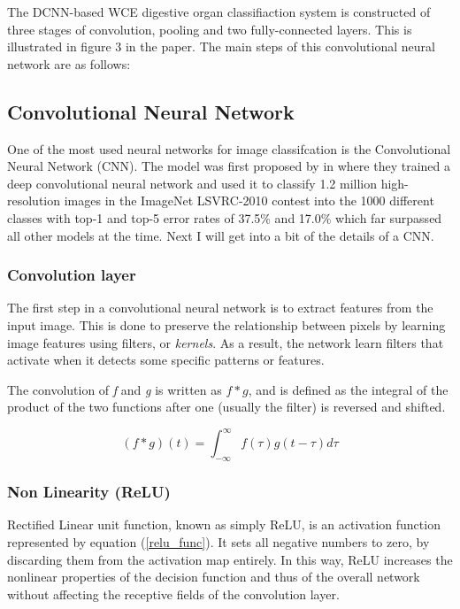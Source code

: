 \documentclass[english, a4paper]{report}
\begin{document}
The DCNN-based WCE digestive organ classifiaction system is constructed of three stages of convolution, pooling and two fully-connected layers. This is illustrated in figure 3 in the paper. \cite{ClassifyingDigestive15} The main steps of this convolutional neural network are as follows:

\subsection{Convolutional Neural Network}
One of the most used neural networks for image classifcation is the Convolutional Neural Network (CNN). The model was first proposed by \citeauthor*{ImageNetClassification12} in \citeyear{ImageNetClassification12} \cite{ImageNetClassification12} where they trained a deep convolutional neural network and used it to classify 1.2 million high-resolution images in the ImageNet LSVRC-2010 contest into the 1000 different classes with top-1 and top-5 error rates of 37.5\% and 17.0\% which far surpassed all other models at the time. Next I will get into a bit of the details of a CNN.


\subsubsection{Convolution layer}
The first step in a convolutional neural network is to extract features from the input image. This is done to preserve the relationship between pixels by learning image features using filters, or \textit{kernels}. As a result, the network learn filters that activate when it detects some specific patterns or features.

The convolution of \textit{f} and \textit{g} is written as $f*g$, and is defined as the integral of the product of the two functions after one (usually the filter) is reversed and shifted.

\begin{equation} %
  (f*g)(t) = \int_{-\infty}^{\infty} f(\tau) g(t-\tau) d\tau
  \label{convolution_func}
\end{equation}


\subsubsection{Non Linearity (ReLU)}
Rectified Linear unit function, known as simply ReLU, is an activation function represented by equation (\ref{relu_func}). It sets all negative numbers to zero, by discarding them from the activation map entirely. In this way, ReLU increases the nonlinear properties of the decision function and thus of the overall network without affecting the receptive fields of the convolution layer.
\end{document}
